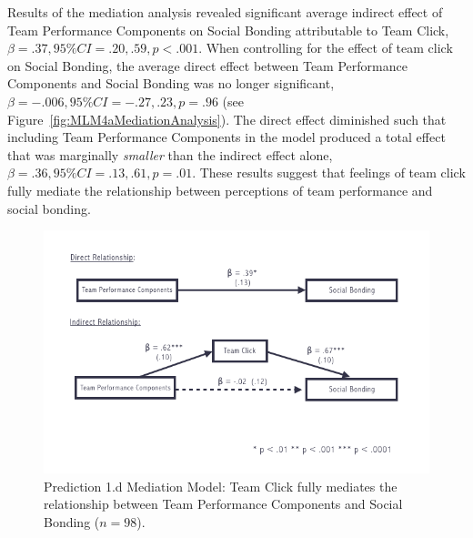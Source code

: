 \begin{CJK}{UTF8}{gbsn}
  Results of the mediation analysis revealed significant average indirect effect of Team Performance Components on Social Bonding attributable to Team Click, $\beta = .37, 95\% CI = .20 , .59, p < .001$.  When controlling for the effect of team click on Social Bonding, the average direct effect between Team Performance Components and Social Bonding was no longer significant, $\beta = -.006, 95\% CI = -.27 , .23, p = .96 $ (see Figure~\ref{fig:MLM4aMediationAnalysis}). The direct effect diminished such that including Team Performance Components in the model produced a total effect that was marginally \textit{smaller} than the indirect effect alone, $\beta = .36, 95\% CI = .13 , .61, p = .01$. These results suggest that feelings of team click fully mediate the relationship between perceptions of team performance and social bonding.



  \begin{figure}
    \centering
    \includegraphics[width=0.9\linewidth,keepaspectratio] {images/tournamentSurveyMediationFigure}
    \caption{Prediction 1.d Mediation Model: Team Click fully mediates the relationship between Team Performance Components and Social Bonding ($n = 98$).}
    \label{fig:tournamentSurveyMediationFigure}
  \end{figure}



\end{CJK}
